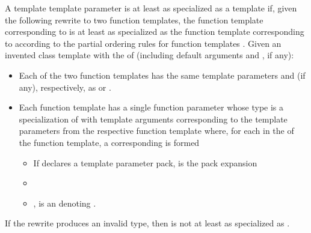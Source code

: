 \documentclass{wg21}
\begin{document}
\pnum
A template template parameter  is
at least as specialized as a template  
if, given the following rewrite to two function templates,
the function template corresponding to 
is at least as specialized as
the function template corresponding to 
according to the partial ordering rules
for function templates .
Given an invented class template 
with the  of  (including default arguments
and , if any):

\begin{itemize}
\item
Each of the two function templates has the same template parameters
and  (if any),
respectively, as  or .
\item
Each function template has a single function parameter
whose type is a specialization of 
with template arguments corresponding to the template parameters
from the respective function template where,
for each  
in the  of the function template,
a corresponding   is formed
\begin{itemize}
    \item
    If  declares a template parameter pack,
      is the pack expansion  \removed{;}
    \item
    \item
    ,  is an  denoting .
\end{itemize}
\end{itemize}
If the rewrite produces an invalid type,
then  is not at least as specialized as .
\end{document}
